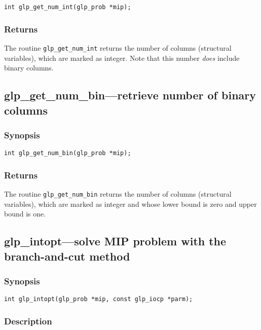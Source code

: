 \begin{verbatim}
int glp_get_num_int(glp_prob *mip);
\end{verbatim}

\subsubsection*{Returns}

The routine \verb|glp_get_num_int| returns the number of columns
(structural variables), which are marked as integer. Note that this
number {\it does} include binary columns.

\subsection{glp\_get\_num\_bin---retrieve number of binary columns}

\subsubsection*{Synopsis}

\begin{verbatim}
int glp_get_num_bin(glp_prob *mip);
\end{verbatim}

\subsubsection*{Returns}

The routine \verb|glp_get_num_bin| returns the number of columns
(structural variables), which are marked as integer and whose lower
bound is zero and upper bound is one.

\subsection{glp\_intopt---solve MIP problem with the branch-and-cut
method}

\subsubsection*{Synopsis}

\begin{verbatim}
int glp_intopt(glp_prob *mip, const glp_iocp *parm);
\end{verbatim}

\subsubsection*{Description}

